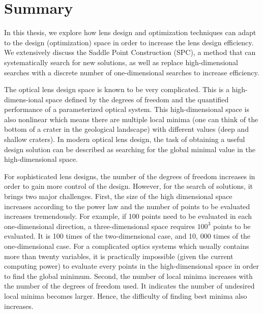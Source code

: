 \chapter*{Summary}

In this thesis, we explore how lens design and optimization techniques can adapt to the design (optimization) space in order to increase the lens design efficiency. We extensively discuss the Saddle Point Construction (SPC), a method that can systematically search for new solutions, as well as replace high-dimensional searches with a discrete number of one-dimensional searches to increase efficiency. 

The optical lens design space is known to be very complicated. This is a high-dimens-ional space defined by the degrees of freedom and the quantified performance of a parameterized optical system. This high-dimensional space is also nonlinear which means there are multiple local minima (one can think of the bottom of a crater in the geological landscape) with different values (deep and shallow craters). In modern optical lens design, the task of obtaining a useful design solution can be described as searching for the global minimal value in the high-dimensional space. 

For sophisticated lens designs, the number of the degrees of freedom increases in order to gain more control of the design. However, for the search of solutions, it brings two major challenges. First, the size of the high dimensional space increases according to the power law and the number of points to be evaluated increases tremendously. For example, if 100 points need to be evaluated in each one-dimensional direction, a three-dimensional space requires $100^3$ points to be evaluated. It is 100 times of the two-dimensional case, and 10, 000 times of the one-dimensional case. For a complicated optics systems which usually contains more than twenty variables, it is practically impossible (given the current computing power) to evaluate every points in the high-dimensional space in order to find the global minimum.  Second, the number of local minima increases with the number of the degrees of freedom used. It indicates the number of undesired local minima becomes larger. Hence, the difficulty of finding best minima also increases.  


